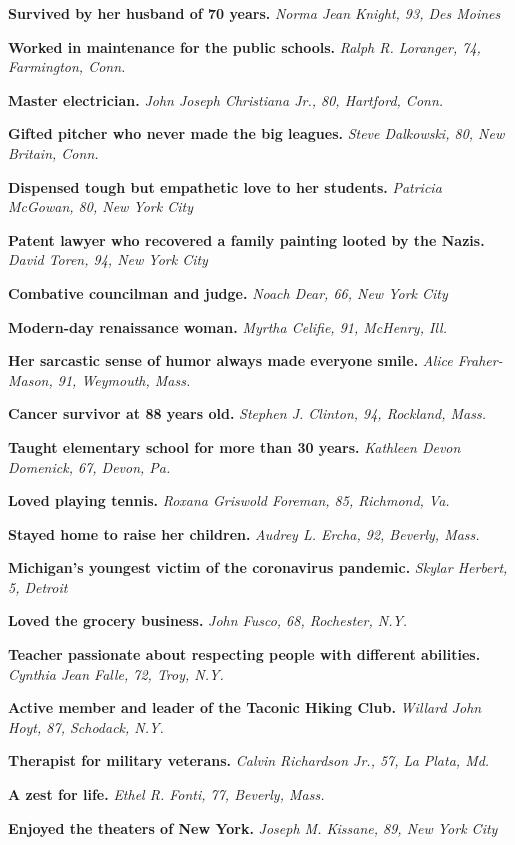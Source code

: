 \textbf{Survived by her husband of 70 years.} \emph{Norma Jean Knight,
93, Des Moines}

\textbf{Worked in maintenance for the public schools.} \emph{Ralph R.
Loranger, 74, Farmington, Conn.}

\textbf{Master electrician.} \emph{John Joseph Christiana Jr., 80,
Hartford, Conn.}

\textbf{Gifted pitcher who never made the big leagues.} \emph{Steve
Dalkowski, 80, New Britain, Conn.}

\textbf{Dispensed tough but empathetic love to her students.}
\emph{Patricia McGowan, 80, New York City}

\textbf{Patent lawyer who recovered a family painting looted by the
Nazis.} \emph{David Toren, 94, New York City}

\textbf{Combative councilman and judge.} \emph{Noach Dear, 66, New York
City}

\textbf{Modern-day renaissance woman.} \emph{Myrtha Celifie, 91,
McHenry, Ill.}

\textbf{Her sarcastic sense of humor always made everyone smile.}
\emph{Alice Fraher-Mason, 91, Weymouth, Mass.}

\textbf{Cancer survivor at 88 years old.} \emph{Stephen J. Clinton, 94,
Rockland, Mass.}

\textbf{Taught elementary school for more than 30 years.} \emph{Kathleen
Devon Domenick, 67, Devon, Pa.}

\textbf{Loved playing tennis.} \emph{Roxana Griswold Foreman, 85,
Richmond, Va.}

\textbf{Stayed home to raise her children.} \emph{Audrey L. Ercha, 92,
Beverly, Mass.}

\textbf{Michigan's youngest victim of the coronavirus pandemic.}
\emph{Skylar Herbert, 5, Detroit}

\textbf{Loved the grocery business.} \emph{John Fusco, 68, Rochester,
N.Y.}

\textbf{Teacher passionate about respecting people with different
abilities.} \emph{Cynthia Jean Falle, 72, Troy, N.Y.}

\textbf{Active member and leader of the Taconic Hiking Club.}
\emph{Willard John Hoyt, 87, Schodack, N.Y.}

\textbf{Therapist for military veterans.} \emph{Calvin Richardson Jr.,
57, La Plata, Md.}

\textbf{A zest for life.} \emph{Ethel R. Fonti, 77, Beverly, Mass.}

\textbf{Enjoyed the theaters of New York.} \emph{Joseph M. Kissane, 89,
New York City}

